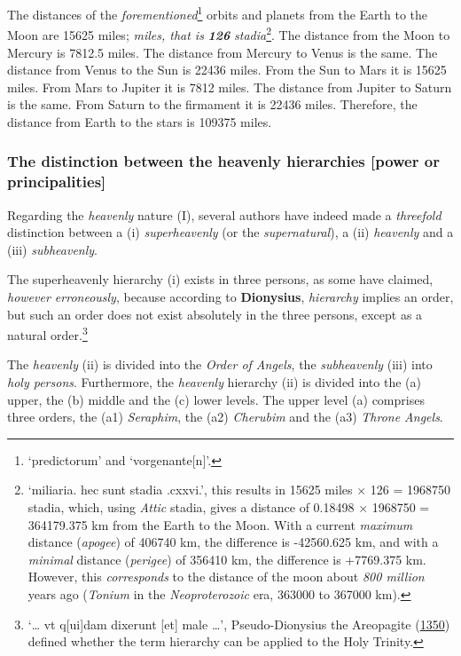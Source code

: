 \documentclass[
]{article}
\begin{document}
The distances of the \emph{forementioned}\footnote{`predictorum' and
  `vorgenante{[}n{]}'.} orbits and planets from the Earth to the Moon
are 15625 miles; \emph{miles, that is} \textbf{\emph{126}}
\emph{stadia}\footnote{`miliaria. hec sunt stadia .cxxvi.', this results
  in 15625 miles × 126 = 1968750 stadia, which, using \emph{Attic}
  stadia, gives a distance of 0.18498 × 1968750 = 364179.375 km from the
  Earth to the Moon. With a current \emph{maximum} distance
  (\emph{apogee}) of 406740 km, the difference is -42560.625 km, and
  with a \emph{minimal} distance (\emph{perigee}) of 356410 km, the
  difference is +7769.375 km. However, this \emph{corresponds} to the distance
  of the moon about \emph{800 million} years ago (\emph{Tonium} in the
  \emph{Neoproterozoic} era, 363000 to 367000 km).}. The distance from
the Moon to Mercury is 7812.5 miles. The distance from Mercury to Venus
is the same. The distance from Venus to the Sun is 22436 miles. From the
Sun to Mars it is 15625 miles. From Mars to Jupiter it is 7812 miles.
The distance from Jupiter to Saturn is the same. From Saturn to the
firmament it is 22436 miles. Therefore, the distance from Earth to the
stars is 109375 miles.

\hypertarget{the-distinction-between-the-heavenly-hierarchies-power-or-principalities}{%
\subsubsection{The distinction between the heavenly hierarchies {[}power
or
principalities{]}}\label{the-distinction-between-the-heavenly-hierarchies-power-or-principalities}}

Regarding the \emph{heavenly} nature (I), several authors have indeed
made a \emph{threefold} distinction between a (i) \emph{superheavenly}
(or the \emph{supernatural}), a (ii) \emph{heavenly} and a (iii)
\emph{subheavenly}.

The superheavenly hierarchy (i) exists in three persons, as some have
claimed, \emph{however erroneously}, because according to
\textbf{Dionysius}, \emph{hierarchy} implies an order, but such an order
does not exist absolutely in the three persons, except as a natural
order.\footnote{`\ldots{} vt q{[}ui{]}dam dixerunt {[}et{]} male
  \ldots{}', Pseudo-Dionysius the Areopagite
  (\href{https://digital.bodleian.ox.ac.uk/objects/ee19a692-5066-4c84-95db-d93c4fc82b97/}{1350})
  defined whether the term hierarchy can be applied to the Holy Trinity.}

The \emph{heavenly} (ii) is divided into the \emph{Order of Angels}, the
\emph{subheavenly} (iii) into \emph{holy persons}. Furthermore, the
\emph{heavenly} hierarchy (ii) is divided into the (a) upper, the (b)
middle and the (c) lower levels. The upper level (a) comprises three
orders, the (a1) \emph{Seraphim}, the (a2) \emph{Cherubim} and the (a3)
\hspace{0pt}\hspace{0pt}\emph{Throne Angels}.
\end{document}
